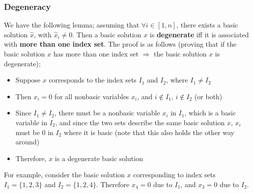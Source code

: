 \documentclass[a4paper, 12pt]{article}
\begin{document}
            \subsubsection*{Degeneracy}
                We have the following lemma; assuming that $\forall i \in [1, n]$, there exists a basic solution $\hat{x}$, with $\hat{x}_i \neq 0$.
                Then a basic solution $x$ is \textbf{degenerate} iff it is associated with \textbf{more than one index set}.
                The proof is as follows (proving that if the basic solution $x$ has more than one index set $\Rightarrow$ the basic solution $x$ is degenerate);
                \begin{itemize}
                    \itemsep0em
                    \item Suppose $x$ corresponds to the index sets $I_1$ and $I_2$, where $I_1 \neq I_2$
                    \item Then $x_i = 0$ for all nonbasic variables $x_i$, and $i \notin I_1$, $i \notin I_2$ (or both)
                    \item Since $I_1 \neq I_2$, there must be a nonbasic variable $x_i$ in $I_1$, which is a basic variable in $I_2$, and since the two sets describe the same basic solution $x$, $x_i$ must be 0 in $I_2$ where it is basic (note that this also holds the other way around)
                    \item Therefore, $x$ is a degenerate basic solution
                \end{itemize}
                For example, consider the basic solution $x$ corresponding to index sets $I_1 = \{1, 2, 3\}$ and $I_2 = \{1, 2, 4\}$.
                Therefore $x_4 = 0$ due to $I_1$, and $x_3 = 0$ due to $I_2$.
                \medskip
\end{document}
